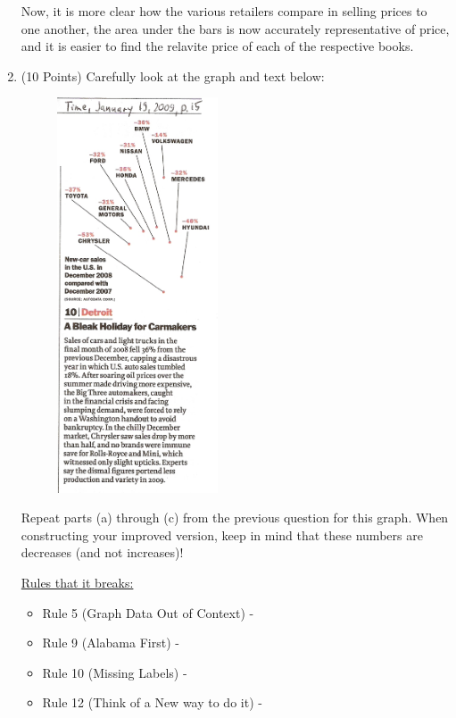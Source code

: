 \documentclass[12pt,letterpaper,final]{article}
\begin{document}
\begin{enumerate}
Now, it is more clear how the various retailers compare in selling prices to one another, the area under the bars is now accurately representative of price, and it is easier to find the relavite price of each of the respective books.
\newpage


\item (10 Points) Carefully look at the graph and text below:

\begin{figure}[ht]
\centerline{
\includegraphics[width=0.45\textwidth]{hw03_q02_Fig2_cars.jpg}}
\end{figure}

Repeat parts (a) through (c) from the previous question for this graph.
When constructing your improved version, keep in mind that these numbers are decreases
(and not increases)!

\break

\underline{Rules that it breaks:}
\begin{itemize}
  \item Rule 5 (Graph Data Out of Context) - 
  \item Rule 9 (Alabama First) - 
  \item Rule 10 (Missing Labels) - 
  \item Rule 12 (Think of a New way to do it) - 
\end{itemize}


\end{enumerate}
\end{document}
